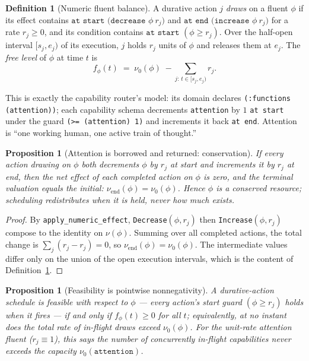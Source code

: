 \documentclass[11pt,oneside]{book}
\theoremstyle{definition}
\newtheorem{definition}{Definition}[chapter]
\theoremstyle{plain}
\newtheorem{proposition}[theorem]{Proposition}
\theoremstyle{remark}
\newcommand{\code}[1]{\texttt{#1}}
\begin{document}
\begin{definition}[Numeric fluent balance]\label{def:balance}
A durative action $j$ \emph{draws} on a fluent $\phi$ if its effect contains
$\code{at start (decrease } \phi\ r_j)$ and $\code{at end (increase } \phi\ r_j)$ for a rate
$r_j\ge 0$, and its condition contains $\code{at start } (\phi \ge r_j)$. Over the half-open
interval $[s_j,e_j)$ of its execution, $j$ holds $r_j$ units of $\phi$ and releases them at
$e_j$. The \emph{free level} of $\phi$ at time $t$ is
\[
f_\phi(t)\;=\;\nu_0(\phi)\;-\!\!\sum_{j:\,t\in[s_j,e_j)}\!\! r_j .
\]
\end{definition}

This is exactly the capability router's model: its domain declares \code{(:functions
(attention))}; each capability schema decrements \code{attention} by $1$ \code{at start} under
the guard \code{(>= (attention) 1)} and increments it back \code{at end}. Attention is ``one
working human, one active train of thought.''

\begin{proposition}[Attention is borrowed and returned: conservation]\label{prop:conserve}
If every action drawing on $\phi$ both decrements $\phi$ by $r_j$ at start and increments it by
$r_j$ at end, then the net effect of each completed action on $\phi$ is zero, and the terminal
valuation equals the initial: $\nu_{\text{end}}(\phi)=\nu_0(\phi)$. Hence $\phi$ is a conserved
resource; scheduling redistributes \emph{when} it is held, never \emph{how much} exists.
\end{proposition}

\begin{proof}
By \code{apply\_numeric\_effect}, \code{Decrease}$(\phi,r_j)$ then \code{Increase}$(\phi,r_j)$
compose to the identity on $\nu(\phi)$. Summing over all completed actions, the total change is
$\sum_j (r_j-r_j)=0$, so $\nu_{\text{end}}(\phi)=\nu_0(\phi)$. The intermediate values differ
only on the union of the open execution intervals, which is the content of
Definition~\ref{def:balance}. \end{proof}

\begin{proposition}[Feasibility is pointwise nonnegativity]\label{prop:balance}
A durative-action schedule is feasible with respect to $\phi$ --- every action's start guard
$(\phi\ge r_j)$ holds when it fires --- if and only if $f_\phi(t)\ge 0$ for all $t$;
equivalently, at no instant does the total rate of in-flight draws exceed $\nu_0(\phi)$. For the
unit-rate attention fluent ($r_j\equiv1$), this says the number of concurrently in-flight
capabilities never exceeds the capacity $\nu_0(\code{attention})$.
\end{proposition}
\end{document}
